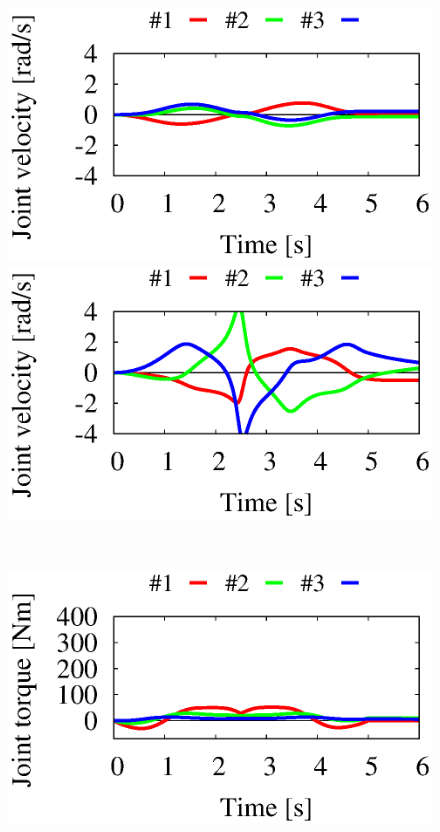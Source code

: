 \begin{figure}[t]
  \centering
  \begin{minipage}[h]{0.40\linewidth}
    \centering
    \includegraphics[width=1.0\linewidth]{fig/chapter6/results/planar/RNS/3RFIX_RNS_X02_Joint_velo.eps}
  \end{minipage}
  \begin{minipage}[h]{0.40\linewidth}
    \centering
    \includegraphics[width=1.0\linewidth]{fig/chapter6/results/planar/OSF/3RFIX_RNS_X02_Joint_velo.eps}
  \end{minipage}\\
  \vspace{-5mm}
  \begin{minipage}[h]{0.40\linewidth}
    \centering
    \includegraphics[width=1.0\linewidth]{fig/chapter6/results/planar/RNS/3RFIX_RNS_U01_torque.eps}

\end{minipage}
\end{figure}
